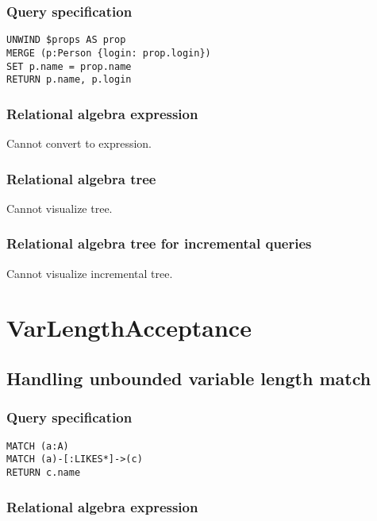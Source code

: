 \subsubsection*{Query specification}

\begin{lstlisting}
UNWIND $props AS prop
MERGE (p:Person {login: prop.login})
SET p.name = prop.name
RETURN p.name, p.login
\end{lstlisting}

\subsubsection*{Relational algebra expression}

Cannot convert to expression.

\subsubsection*{Relational algebra tree}

Cannot visualize tree.

\subsubsection*{Relational algebra tree for incremental queries}

Cannot visualize incremental tree.

\section{VarLengthAcceptance}

\subsection{Handling unbounded variable length match}

\subsubsection*{Query specification}

\begin{lstlisting}
MATCH (a:A)
MATCH (a)-[:LIKES*]->(c)
RETURN c.name
\end{lstlisting}

\subsubsection*{Relational algebra expression}

